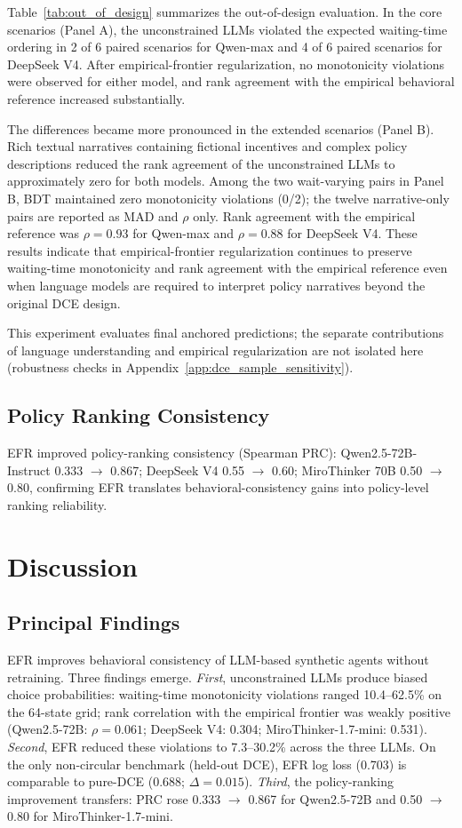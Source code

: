 \documentclass[11pt]{article}
\begin{document}
Table~\ref{tab:out_of_design} summarizes the out-of-design evaluation. In the core scenarios (Panel A), the unconstrained LLMs violated the expected waiting-time ordering in 2 of 6 paired scenarios for Qwen-max and 4 of 6 paired scenarios for DeepSeek V4. After empirical-frontier regularization, no monotonicity violations were observed for either model, and rank agreement with the empirical behavioral reference increased substantially.

The differences became more pronounced in the extended scenarios (Panel B). Rich textual narratives containing fictional incentives and complex policy descriptions reduced the rank agreement of the unconstrained LLMs to approximately zero for both models. Among the two wait-varying pairs in Panel B, BDT maintained zero monotonicity violations (0/2); the twelve narrative-only pairs are reported as MAD and $\rho$ only. Rank agreement with the empirical reference was $\rho = 0.93$ for Qwen-max and $\rho = 0.88$ for DeepSeek V4. These results indicate that empirical-frontier regularization continues to preserve waiting-time monotonicity and rank agreement with the empirical reference even when language models are required to interpret policy narratives beyond the original DCE design.

This experiment evaluates final anchored predictions; the separate contributions of language understanding and empirical regularization are not isolated here (robustness checks in Appendix~\ref{app:dce_sample_sensitivity}).

\clearpage
\subsection{Policy Ranking Consistency}
\label{sec:policy_ranking}

EFR improved policy-ranking consistency (Spearman PRC): Qwen2.5-72B-Instruct 0.333 $\to$ 0.867; DeepSeek V4 0.55 $\to$ 0.60; MiroThinker 70B 0.50 $\to$ 0.80, confirming EFR translates behavioral-consistency gains into policy-level ranking reliability.

\section{Discussion}
\subsection{Principal Findings}

EFR improves behavioral consistency of LLM-based synthetic agents without retraining. Three findings emerge. \emph{First}, unconstrained LLMs produce biased choice probabilities: waiting-time monotonicity violations ranged 10.4--62.5\% on the 64-state grid; rank correlation with the empirical frontier was weakly positive (Qwen2.5-72B: $\rho = 0.061$; DeepSeek V4: 0.304; MiroThinker-1.7-mini: 0.531). \emph{Second}, EFR reduced these violations to 7.3--30.2\% across the three LLMs. On the only non-circular benchmark (held-out DCE), EFR log loss (0.703) is comparable to pure-DCE (0.688; $\Delta = 0.015$). \emph{Third}, the policy-ranking improvement transfers: PRC rose 0.333 $\to$ 0.867 for Qwen2.5-72B and 0.50 $\to$ 0.80 for MiroThinker-1.7-mini.
\end{document}
